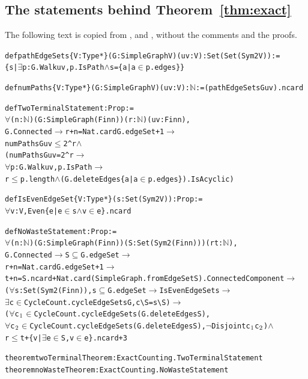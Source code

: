 \documentclass[11pt]{article}
\theoremstyle{definition}
\theoremstyle{remark}
\numberwithin{equation}{section}
\begin{document}
\subsection{The statements behind Theorem~\ref{thm:exact}}

The following text is copied from ,
 and , without the comments and the proofs.

{\small
\begin{alltt}
def pathEdgeSets \{V : Type*\} (G : SimpleGraph V) (u v : V) : Set (Set (Sym2 V)) :=
  \{s | \(\exists\) p : G.Walk u v, p.IsPath \(\land\) s = \{a | a \(\in\) p.edges\}\}

def numPaths \{V : Type*\} (G : SimpleGraph V) (u v : V) : \(\mathbb{N}\) := (pathEdgeSets G u v).ncard

def TwoTerminalStatement : Prop :=
  \(\forall\) (n : \(\mathbb{N}\)) (G : SimpleGraph (Fin n)) (r : \(\mathbb{N}\)) (u v : Fin n),
    G.Connected \(\to\) r + n = Nat.card G.edgeSet + 1 \(\to\)
      numPaths G u v \(\le\) 2 ^ r \(\land\)
      (numPaths G u v = 2 ^ r \(\to\)
        \(\forall\) p : G.Walk u v, p.IsPath \(\to\)
          r \(\le\) p.length \(\land\) (G.deleteEdges \{a | a \(\in\) p.edges\}).IsAcyclic)

def IsEvenEdgeSet \{V : Type*\} (s : Set (Sym2 V)) : Prop :=
  \(\forall\) v : V, Even \{e | e \(\in\) s \(\land\) v \(\in\) e\}.ncard

def NoWasteStatement : Prop :=
  \(\forall\) (n : \(\mathbb{N}\)) (G : SimpleGraph (Fin n)) (S : Set (Sym2 (Fin n))) (r t : \(\mathbb{N}\)),
    G.Connected \(\to\) S \(\subseteq\) G.edgeSet \(\to\)
    r + n = Nat.card G.edgeSet + 1 \(\to\)
    t + n = S.ncard + Nat.card (SimpleGraph.fromEdgeSet S).ConnectedComponent \(\to\)
    (\(\forall\) s : Set (Sym2 (Fin n)), s \(\subseteq\) G.edgeSet \(\to\) IsEvenEdgeSet s \(\to\)
      \(\exists\) c \(\in\) CycleCount.cycleEdgeSets G, c \textbackslash{} S = s \textbackslash{} S) \(\to\)
    (\(\forall\) c\(\sb{1}\) \(\in\) CycleCount.cycleEdgeSets (G.deleteEdges S),
      \(\forall\) c\(\sb{2}\) \(\in\) CycleCount.cycleEdgeSets (G.deleteEdges S), \(\lnot\) Disjoint c\(\sb{1}\) c\(\sb{2}\)) \(\land\)
    r \(\le\) t + \{v | \(\exists\) e \(\in\) S, v \(\in\) e\}.ncard + 3

theorem twoTerminalTheorem : ExactCounting.TwoTerminalStatement
theorem noWasteTheorem : ExactCounting.NoWasteStatement
\end{alltt}}
\end{document}
